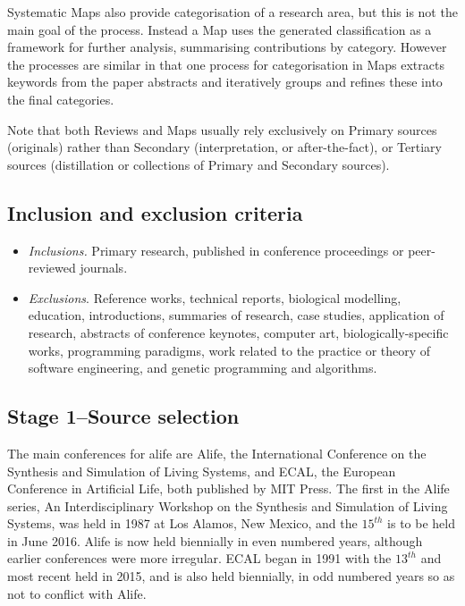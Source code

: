 Systematic Maps also provide categorisation of a research area, but this is not the main goal of the process. Instead a Map uses the generated classification as a framework for further analysis, summarising contributions by category. However the processes are similar in that one process for categorisation in Maps \parencite{Petersen:2008fk} extracts keywords from the paper abstracts and iteratively groups and refines these into the final categories.

Note that both Reviews and Maps usually rely exclusively on Primary sources (originals) rather than Secondary (interpretation, or after-the-fact), or Tertiary sources (distillation or collections of Primary and Secondary sources).

\subsection{Inclusion and exclusion criteria}

\begin{itemize}
	\item \emph{Inclusions.} Primary research, published in conference proceedings or peer-reviewed journals.
	\item \emph{Exclusions}. Reference works, technical reports, biological modelling, education, introductions, summaries of research, case studies, application of research, abstracts of conference keynotes, computer art, biologically-specific works, programming paradigms, work related to the practice or theory of software engineering, and genetic programming and algorithms.
\end{itemize}

\subsection{Stage 1--Source selection}
The main conferences for \gls{alife} are Alife, the International Conference on the Synthesis and Simulation of Living Systems, and ECAL, the European Conference in Artificial Life, both published by MIT Press. The first in the Alife series, An Interdisciplinary Workshop on the Synthesis and Simulation of Living Systems, was held in 1987 at Los Alamos, New Mexico, and the $15^{th}$ is to be held in June 2016. Alife is now held biennially in even numbered years, although earlier conferences were more irregular. ECAL began  in 1991 with the $13^{th}$ and most recent held in 2015, and is also held biennially, in odd numbered years so as not to conflict with Alife.

